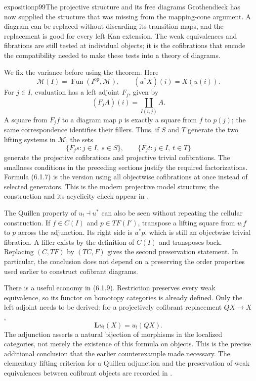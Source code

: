 
\begin{dcomment}{exposition}{p99}{The projective structure and its free diagrams}
Grothendieck has now supplied the structure that was missing from the mapping-cone argument. A diagram can be replaced without discarding its transition maps, and the replacement is good for every left Kan extension. The weak equivalences and fibrations are still tested at individual objects; it is the cofibrations that encode the compatibility needed to make these tests into a theory of diagrams.

We fix the variance before using the theorem. Here
\[
 \mathcal M(I)=\operatorname{Fun}(I^{\mathrm{op}},\mathcal M),
 \qquad
 (u^*X)(i)=X(u(i)).
\]
For $j\in I$, evaluation has a left adjoint $F_j$, given by
\[
 (F_jA)(i)=\coprod_{I(i,j)}A.
\]
A square from $F_jf$ to a diagram map $p$ is exactly a square from $f$ to $p(j)$; the same correspondence identifies their fillers. Thus, if $S$ and $T$ generate the two lifting systems in $\mathcal M$, the sets
\[
 \{F_js:j\in I,\ s\in S\},\qquad
 \{F_jt:j\in I,\ t\in T\}
\]
generate the projective cofibrations and projective trivial cofibrations. The smallness conditions in the preceding sections justify the required factorizations. Formula (6.1.7) is the version using all objectwise cofibrations at once instead of selected generators. This is the modern projective model structure; the construction and its acyclicity check appear in \citet[Theorem~12.3.2]{Riehl2014}.

The Quillen property of $u_!\dashv u^*$ can also be seen without repeating the cellular construction. If $f\in C(I)$ and $p\in TF(I')$, transpose a lifting square from $u_!f$ to $p$ across the adjunction. Its right side is $u^*p$, which is still an objectwise trivial fibration. A filler exists by the definition of $C(I)$ and transposes back. Replacing $(C,TF)$ by $(TC,F)$ gives the second preservation statement. In particular, the conclusion does not depend on $u$ preserving the order properties used earlier to construct cofibrant diagrams.

There is a useful economy in (6.1.9). Restriction preserves every weak equivalence, so its functor on homotopy categories is already defined. Only the left adjoint needs to be derived: for a projectively cofibrant replacement $QX\to X$,
\[
 \mathbf L u_!(X)=u_!(QX).
\]
The adjunction asserts a natural bijection of morphisms in the localized categories, not merely the existence of this formula on objects. This is the precise additional conclusion that the earlier counterexample made necessary. The elementary lifting criterion for a Quillen adjunction and the preservation of weak equivalences between cofibrant objects are recorded in \citet[Lemmas~11.3.11 and~11.3.14]{Riehl2014}.
\end{dcomment}

